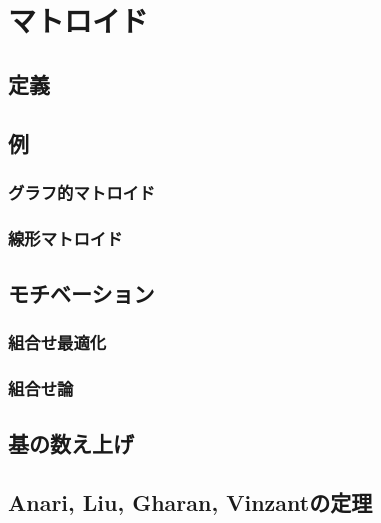 \section{マトロイド}
\subsection{定義}
\subsection{例}
\subsubsection{グラフ的マトロイド}
\subsubsection{線形マトロイド}
\subsection{モチベーション}
\subsubsection{組合せ最適化}
\subsubsection{組合せ論}
\subsection{基の数え上げ}
\subsection{Anari, Liu, Gharan, Vinzantの定理}
